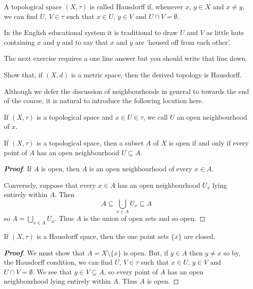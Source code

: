 \begin{definition} A topological space $(X,\tau)$ is called
Hausdorff if, whenever $x,\,y\in X$ and $x\neq y$, we can
find $U,\,V\in\tau$ such that $x\in U$, $y\in V$ and
$U\cap V=\emptyset$.
\end{definition}
In the English educational system it is traditional
to draw $U$ and $V$ as little huts containing $x$ and $y$
and to say that $x$ and $y$ are 'housed off from each other'.

The next exercise requires a one line answer but you should
write that line down.
\begin{exercise} Show that, 
if $(X,d)$ is a metric space, then the
derived topology is Hausdorff.
\end{exercise}

Although we defer the discussion of neighbourhoods
in general to towards the end of the course, it is natural
to introduce the following locution here.
\begin{definition}\label{D;open neighbourhood}
If $(X,\tau)$ is a topological space and $x\in U\in\tau$,
we call $U$ an open neighbourhood of $x$.
\end{definition}



\begin{theorem}\label{T;open via neighbourhood} 
If $(X,\tau)$ is a topological space, then
a subset $A$ of $X$ is open if and only if every
point of $A$ has an open neighbourhood $U\subseteq A$.
\end{theorem}
\begin{proof}[\bf Proof]
If $A$ is open, then $A$ is an open neighbourhood of every $x\in A$.

Conversely, suppose that every $x\in A$ has an open neighbourhood
$U_{x}$ lying entirely within $A$. Then
\[A\subseteq \bigcup_{x\in A} U_{x}\subseteq A\]
so $A= \bigcup_{x\in A} U_{x}$. Thus $A$ is the union of open sets
and so open.
\end{proof}


\begin{theorem}\label{L;Hausdorff point}
If $(X,\tau)$ is a Hausdorff space, then the one
point sets $\{x\}$ are closed.
\end{theorem}
\begin{proof}[\bf Proof] We must show that $A=X\setminus\{x\}$ is open.
But, if $y\in A$ then $y\neq x$ so by, the Hausdorff condition,
we can find $U,\,V\in\tau$ such that $x\in U$, $y\in V$
and $U\cap V=\emptyset$. We see that $y\in V\subseteq A$,
so every point of $A$ has an open neighbourhood
lying entirely within $A$. Thus $A$ is open. 
\end{proof}


